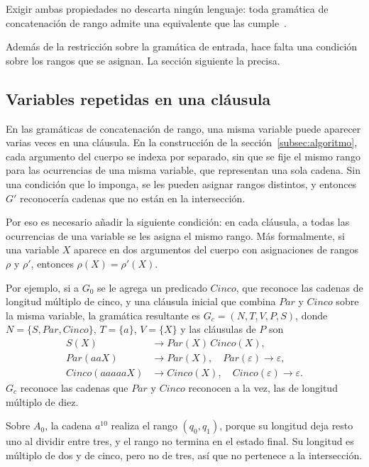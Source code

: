 \documentclass{report}
\theoremstyle{definition}
\theoremstyle{plain}
\theoremstyle{remark}
\begin{document}
Exigir ambas propiedades no descarta ningún lenguaje: toda gramática de
concatenación de rango admite una equivalente que las
cumple~\cite{boullier1998proposal, kallmeyer2010parsing}.

Además de la restricción sobre la gramática de entrada, hace falta una
condición sobre los rangos que se asignan. La sección siguiente la
precisa.

\subsection{Variables repetidas en una cláusula}\label{subsec:coherencia}

En las gramáticas de concatenación de rango, una misma variable puede
aparecer varias veces en una cláusula. En la construcción de la
sección~\ref{subsec:algoritmo}, cada argumento del cuerpo se indexa por
separado,
sin que se fije el mismo rango para las ocurrencias de una misma
variable, que representan una sola cadena.
Sin una condición que lo imponga, se les pueden asignar rangos
distintos, y entonces $G'$ reconocería cadenas que no están en la
intersección.

Por eso es necesario añadir la siguiente condición: en cada cláusula,
a todas las ocurrencias de una variable se les asigna el mismo rango.
Más formalmente, si una variable $X$ aparece en dos argumentos del
cuerpo con asignaciones de rangos $\rho$ y $\rho'$, entonces
$\rho(X) = \rho'(X)$.

Por ejemplo, si a $G_0$ se le agrega un predicado $Cinco$, que reconoce
las cadenas de longitud múltiplo de cinco, y una cláusula inicial que
combina $Par$ y $Cinco$ sobre la misma variable, la gramática
resultante es $G_c = (N, T, V, P, S)$, donde $N = \{S, Par, Cinco\}$,
$T = \{a\}$, $V = \{X\}$ y las cláusulas de $P$ son
\[
\begin{aligned}
  S(X) &\to Par(X)\,Cinco(X), \\
  Par(aaX) &\to Par(X), \quad Par(\varepsilon) \to \varepsilon, \\
  Cinco(aaaaaX) &\to Cinco(X), \quad Cinco(\varepsilon) \to \varepsilon.
\end{aligned}
\]
$G_c$ reconoce las cadenas que $Par$ y $Cinco$ reconocen a la vez, las
de longitud múltiplo de diez.

Sobre $A_0$, la cadena $a^{10}$ realiza el rango $(q_0, q_1)$, porque su
longitud deja resto uno al dividir entre tres, y el rango no termina en
el estado final. Su longitud es múltiplo de dos y de cinco, pero no de
tres, así que no pertenece a la intersección.
\end{document}
